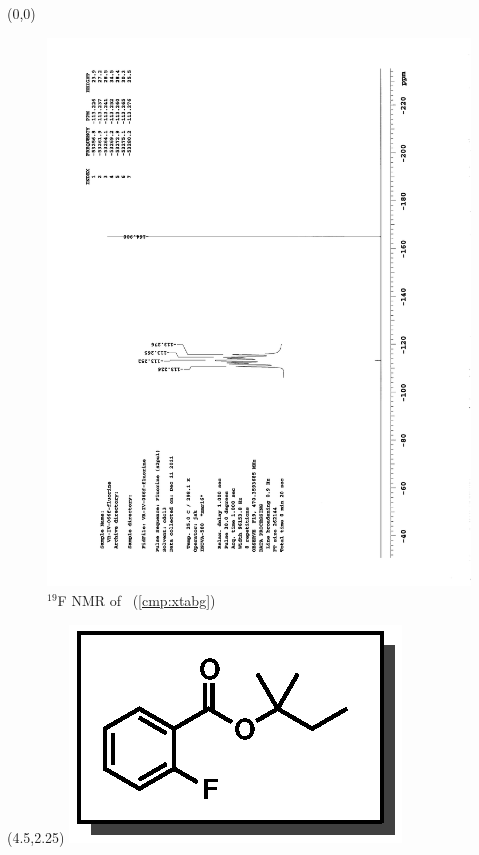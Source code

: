 \clearpage
\begin{textblock}{20}(0,0)
\begin{figure}[htb]
\caption{$^{19}$F NMR of  \CMPxtabg\ (\ref{cmp:xtabg})}
\includegraphics[scale=0.75, trim = 0mm 0mm 0mm 5mm,
clip]{chp_asymmetric/images/nmr/xtabgF}
\vspace{-100pt}
\end{figure}
\end{textblock}
\begin{textblock}{1}(4.5,2.25)
\includegraphics[scale=0.8, angle=90]{chp_asymmetric/images/xtabg}
\end{textblock}
\clearpage

